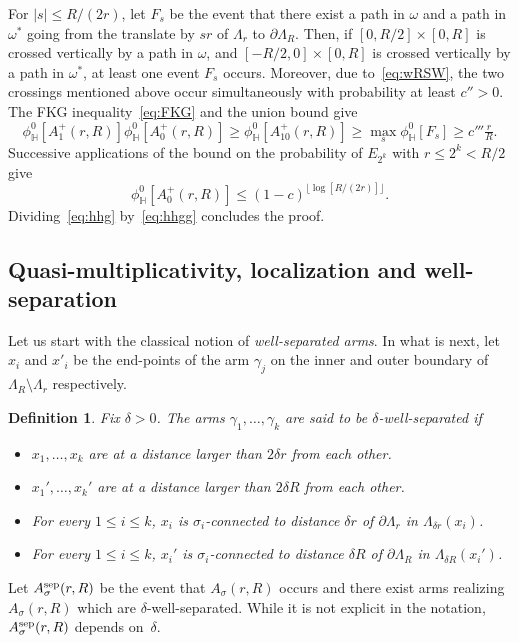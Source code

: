 \documentclass[a4paper,oneside,11pt]{article}
\newtheorem{definition}[theorem]{Definition}
\numberwithin{equation}{section}
\numberwithin{equation}{section}
\numberwithin{equation}{section}
\newcommand{\bbH}{\mathbb{H}}
\begin{document}
For $|s|\le R/(2r)$, let $F_s$ be the event that there exist a path in $\omega$ and a path in $\omega^*$ going from the translate by $sr$ of $\Lambda_r$ to $\partial\Lambda_R$.  Then, if $[0,R/2]\times[0,R]$ is crossed vertically by a path in $\omega$, 
and $[-R/2,0]\times[0,R]$ is crossed vertically by a path in $\omega^*$, at least one event $F_s$ occurs. 
Moreover, due to~\eqref{eq:wRSW}, the two crossings mentioned above occur simultaneously with probability at least $c''>0$.
The FKG inequality~\eqref{eq:FKG} and the union bound give
\begin{equation}\label{eq:hhg}
	\phi_{\bbH}^0[A^+_1(r,R)]\phi_{\bbH}^0[A^+_0(r,R)]\ge \phi_{\bbH}^0[A^+_{10}(r,R)]\ge\max_s\phi_{\bbH}^0[F_s]\ge c'''\tfrac rR.
\end{equation}
Successive applications of the bound on the probability of $E_{2^k}$ with $r\le 2^k< R/2$ give
\begin{equation}\label{eq:hhgg}
	\phi_{\bbH}^0[A^+_0(r,R)]\le (1-c)^{\lfloor \log[R/(2r)]\rfloor}.
\end{equation}
Dividing~\eqref{eq:hhg} by~\eqref{eq:hhgg} concludes the proof.


\subsection{Quasi-multiplicativity, localization and well-separation}\label{sec:4.2}


Let us start with the classical notion of {\em well-separated arms}. In what is next, let $x_i$ and $x'_i$ be the end-points of the arm $\gamma_j$ on the inner and outer boundary of $\Lambda_R\setminus\Lambda_r$ respectively.
\begin{definition} Fix $\delta>0$. The arms $\gamma_1,\dots,\gamma_k$ are said to be $\delta$-\emph{well-separated} if
\begin{itemize}[noitemsep]
\item $x_1,\dots,x_k$ are at a distance larger than $2\delta r$ from each other.
\item $x_1',\dots,x_k'$ are at a distance larger than $2\delta R$ from each other.
\item For every $1\le i\le k$, $x_i$ is $\sigma_i$-connected to distance $\delta r$ of $\partial\Lambda_r$ in $\Lambda_{\delta r}(x_i)$.
\item For every $1\le i\le k$, $x_i'$ is $\sigma_i$-connected to distance $\delta R$ of $\partial\Lambda_R$ in $\Lambda_{\delta R}(x_i')$.
\end{itemize}
\end{definition}
Let $A_{\sigma}^{\rm sep}(r,R)$ be the event
that $A_{\sigma}(r,R)$ occurs and there exist arms realizing
$A_{\sigma}(r,R)$ which are $\delta$-well-separated. While it is not explicit in the notation, $A_{\sigma}^{\rm sep}(r,R)$ depends on~$\delta$.
\end{document}
